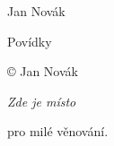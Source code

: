 \documentclass[10pt,a5paper]{book}
\makeatletter
\def\cleardoublepage{\clearpage\if@twoside \ifodd\c@page\else
	\begingroup
	\mbox{}
	\thispagestyle{empty}
	\newpage
	\endgroup\fi\fi}
\makeatother
\begin{document}
\pagestyle{empty}
\begin{center}
	\vspace*{\fill}
	\Huge\sc
	Jan Novák

	Povídky
	\vspace{1em}
	\vspace{\fill}
\end{center}
\clearpage

\vspace*{\fill}
{ 
	\setlength\parindent{0pt}

	© Jan Novák \the\year
}
\clearpage

\begin{flushright}
	\vspace*{\fill}
	\it
	Zde je místo

	pro milé věnování.
	\vspace{\fill}
\end{flushright}
\cleardoublepage

{
	\renewcommand{\bfseries}{\mdseries}
	\tableofcontents
}
\thispagestyle{empty}
\cleardoublepage

\pagestyle{fancy}

% 
% 
% 

\clearpage
\pagestyle{empty}
\cleardoublepage

% 
\thispagestyle{empty}
\cleardoublepage
\end{document}
